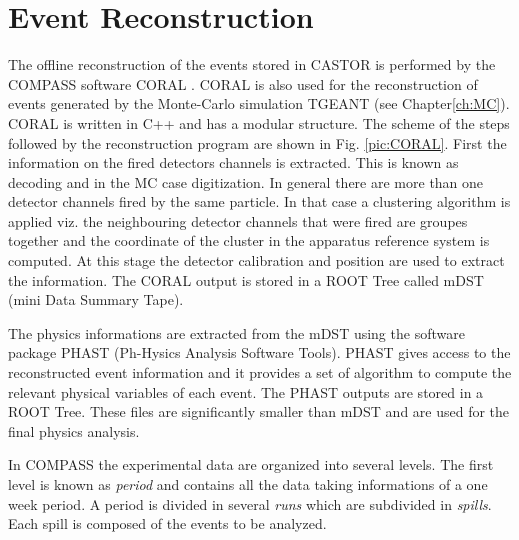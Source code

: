 
\section{Event Reconstruction}

The offline reconstruction of the events stored in CASTOR is performed by the COMPASS software CORAL \cite{}. CORAL is also used for the reconstruction of events generated by the Monte-Carlo
simulation TGEANT (see Chapter\ref{ch:MC}). CORAL is written in C++ and has a modular structure. The scheme of the steps followed by the reconstruction program are shown in Fig. \ref{pic:CORAL}. First the
information on the fired detectors channels is extracted. This is known as decoding and in the MC case digitization. In general there are more than one detector channels fired by the same
particle. In that case a clustering algorithm is applied viz. the neighbouring detector channels that were fired are groupes together and the coordinate of the cluster in the apparatus reference
system is computed. At this stage the detector calibration and position are used to extract the information. The CORAL output is stored in a ROOT Tree called mDST (mini Data Summary Tape).

The physics informations are extracted from the mDST using the software package PHAST (Ph-Hysics Analysis Software Tools). PHAST gives access to the reconstructed event information and it provides
a set of algorithm to compute the relevant physical variables of each event. The PHAST outputs are stored in a ROOT Tree. These files are significantly smaller than mDST and are used for the final
physics analysis.

In COMPASS the experimental data are organized into several levels. The first level is known as \textit{period} and contains all the data taking informations of a one week period. A period is
divided in several \textit{runs} which are subdivided in \textit{spills}. Each spill is composed of the events to be analyzed.

